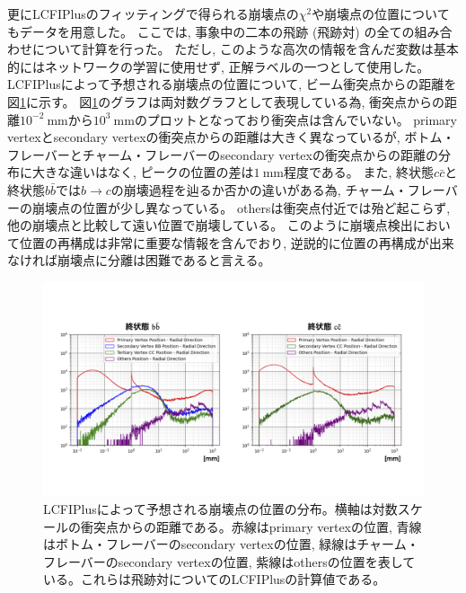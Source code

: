 更にLCFIPlusのフィッティングで得られる崩壊点の$\chi^2$や崩壊点の位置についてもデータを用意した。
ここでは, 事象中の二本の飛跡 (飛跡対) の全ての組み合わせについて計算を行った。
ただし, このような高次の情報を含んだ変数は基本的にはネットワークの学習に使用せず, 正解ラベルの一つとして使用した。
LCFIPlusによって予想される崩壊点の位置について, ビーム衝突点からの距離を図\ref{3-1-2-3VertexPositions}に示す。
図\ref{3-1-2-3VertexPositions}のグラフは両対数グラフとして表現している為, 衝突点からの距離$10^{-2}\ \mathrm{mm}$から$10^{3}\ \mathrm{mm}$のプロットとなっており衝突点は含んでいない。
primary vertexとsecondary vertexの衝突点からの距離は大きく異なっているが, ボトム・フレーバーとチャーム・フレーバーのsecondary vertexの衝突点からの距離の分布に大きな違いはなく, ピークの位置の差は$1\ \mathrm{mm}$程度である。
また, 終状態$c\bar{c}$と終状態$b\bar{b}$では$b \to c$の崩壊過程を辿るか否かの違いがある為, チャーム・フレーバーの崩壊点の位置が少し異なっている。
othersは衝突点付近では殆ど起こらず, 他の崩壊点と比較して遠い位置で崩壊している。
このように崩壊点検出において位置の再構成は非常に重要な情報を含んでおり, 逆説的に位置の再構成が出来なければ崩壊点に分離は困難であると言える。

\begin{figure}[htbp]
 \centering
 \includegraphics[trim = 50 100 50 150, width=1.0\textwidth, clip]{Figure/3Networks/3-1-2-3VertexPositions.png}
 \caption[LCFIPlusによって予想される崩壊点の位置の分布]{LCFIPlusによって予想される崩壊点の位置の分布。横軸は対数スケールの衝突点からの距離である。赤線はprimary vertexの位置, 青線はボトム・フレーバーのsecondary vertexの位置, 緑線はチャーム・フレーバーのsecondary vertexの位置, 紫線はothersの位置を表している。これらは飛跡対についてのLCFIPlusの計算値である。}
 \label{3-1-2-3VertexPositions}
\end{figure}

